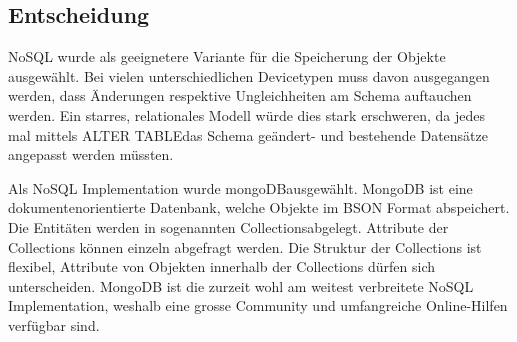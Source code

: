 \subsection{Entscheidung}
NoSQL wurde als geeignetere Variante für die Speicherung der Objekte ausgewählt. Bei vielen unterschiedlichen Devicetypen muss davon ausgegangen werden, dass Änderungen respektive Ungleichheiten am Schema auftauchen werden. Ein starres, relationales Modell würde dies stark erschweren, da jedes mal mittels \glqq ALTER TABLE\grqq  das Schema geändert- und bestehende Datensätze angepasst werden müssten.

Als NoSQL Implementation wurde \glqq mongoDB\grqq ausgewählt. MongoDB ist eine dokumentenorientierte Datenbank, welche Objekte im BSON Format abspeichert. Die Entitäten werden in sogenannten \glqq Collections\grqq  abgelegt. Attribute der Collections können einzeln abgefragt werden. Die Struktur der Collections ist flexibel, Attribute von Objekten innerhalb der Collections dürfen sich unterscheiden. MongoDB ist die zurzeit wohl am weitest verbreitete NoSQL Implementation, weshalb eine grosse Community und umfangreiche Online-Hilfen verfügbar sind.
 





